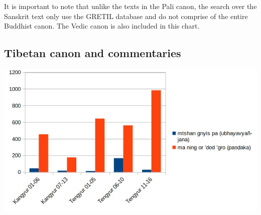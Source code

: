 \medskip
It is important to note that unlike the texts in the Pali canon, the search over the Sanskrit text only use the GRETIL database and do not comprise of the entire Buddhist canon. The Vedic canon is also included in this chart.


\subsection{Tibetan canon and commentaries}

\includegraphics[width=\linewidth]{tibetan.jpg}
\label{tibetan1}


